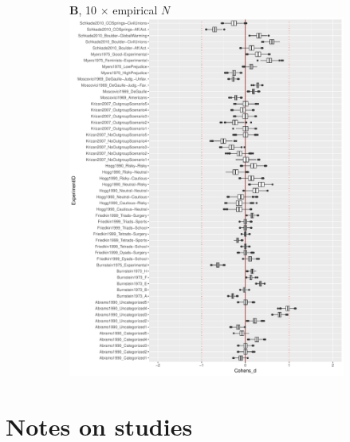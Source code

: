 \documentclass[11pt, letterpaper]{article}
\begin{document}
\begin{figure}
\begin{subfigure}[]{0.9\textwidth}
    \label{fig:MetricBoxplot_N}
  \end{subfigure} \\
\end{figure}
\begin{figure}\ContinuedFloat
  \begin{subfigure}[]{0.9\textwidth}
    \centering
    \textsf{\large \textbf{B}, 10 $\times$ empirical $N$} \\
    \includegraphics[width=\textwidth]{Figures/boxplots/10N_metric_cohens.pdf}
    \label{fig:MetricBoxplot_10N}
  \end{subfigure}
\end{figure}


\clearpage

\section*{Notes on studies}
\end{document}
